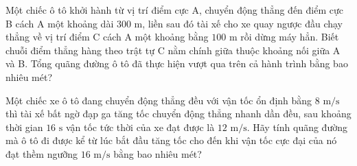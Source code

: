 	\begin{ex}%
		Một chiếc ô tô khởi hành từ vị trí điểm cực A, chuyển động thẳng đến điểm cực B cách A một khoảng dài $300\text{ m}$, liền sau đó tài xế cho xe quay ngược đầu chạy thẳng về vị trí điểm C cách A một khoảng bằng $100\text{ m}$ rồi dừng máy hẳn. Biết chuỗi điểm thẳng hàng theo trật tự C nằm chính giữa thuộc khoảng nối giữa A và B. Tổng quãng đường ô tô đã thực hiện vượt qua trên cả hành trình bằng bao nhiêu mét?
	\end{ex}
	
	\begin{ex}%
		Một chiếc xe ô tô đang chuyển động thẳng đều với vận tốc ổn định bằng $8\text{ m/s}$ thì tài xế bất ngờ đạp ga tăng tốc chuyển động thẳng nhanh dần đều, sau khoảng thời gian $16\text{ s}$ vận tốc tức thời của xe đạt được là $12\text{ m/s}$. Hãy tính quãng đường mà ô tô đi được kể từ lúc bắt đầu tăng tốc cho đến khi vận tốc cực đại của nó đạt thềm ngưỡng $16\text{ m/s}$ bằng bao nhiêu mét?
	\end{ex}
	
